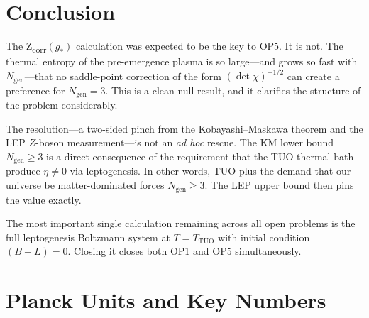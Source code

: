 \documentclass[12pt,a4paper]{article}
\theoremstyle{definition}
\newcommand{\TTUO}{T_{\mathrm{TUO}}}
\newcommand{\Ngen}{N_{\mathrm{gen}}}
\begin{document}
\section{Conclusion}
\label{sec:conc}

The Z\textsubscript{corr}$(g_*)$ calculation was expected to be the key to OP5.
It is not. The thermal entropy of the pre-emergence plasma is so large---and
grows so fast with $\Ngen$---that no saddle-point correction of the form
$(\det\chi)^{-1/2}$ can create a preference for $\Ngen = 3$. This is a clean
null result, and it clarifies the structure of the problem considerably.

The resolution---a two-sided pinch from the Kobayashi--Maskawa theorem and
the LEP $Z$-boson measurement---is not an \emph{ad hoc} rescue. The KM lower
bound $\Ngen \geq 3$ is a direct consequence of the requirement that the TUO
thermal bath produce $\eta \neq 0$ via leptogenesis. In other words, TUO
plus the demand that our universe be matter-dominated forces $\Ngen \geq 3$.
The LEP upper bound then pins the value exactly.

The most important single calculation remaining across all open problems is the
full leptogenesis Boltzmann system at $T = \TTUO$ with initial condition
$(B-L) = 0$. Closing it closes both OP1 and OP5 simultaneously.

\appendix
\section{Planck Units and Key Numbers}
\end{document}
